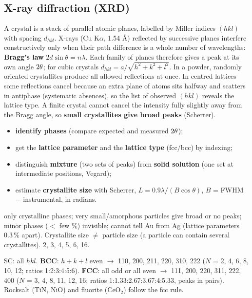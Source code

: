 \subsection{X-ray diffraction (XRD)}
{A crystal is a stack of parallel atomic planes, labelled by Miller indices $(hkl)$ with spacing $d_{hkl}$. X-rays (Cu K$\alpha$,
1.54 \AA) reflected by successive planes interfere constructively only when their path difference is a whole number of wavelengths:
\textbf{Bragg's law} $2d\sin\theta = n\lambda$. Each family of planes therefore gives a peak at its own angle $2\theta$; for cubic
crystals $d_{hkl} = a/\sqrt{h^2+k^2+l^2}$. In a powder, randomly oriented crystallites produce all allowed reflections at once.
In centred lattices some reflections cancel because an extra plane of atoms sits halfway and scatters in antiphase (systematic
absences), so the list of observed $(hkl)$ reveals the lattice type. A finite crystal cannot cancel the intensity fully slightly away
from the Bragg angle, so \textbf{small crystallites give broad peaks} (Scherrer).}
{\begin{itemize}
 \item \textbf{identify phases} (compare expected and measured $2\theta$);
 \item get the \textbf{lattice parameter} and the \textbf{lattice type} (fcc/bcc) by indexing;
 \item distinguish \textbf{mixture} (two sets of peaks) from \textbf{solid solution} (one set at intermediate positions, Vegard\extra);
 \item estimate \textbf{crystallite size} with Scherrer, $L = 0.9\lambda/(B\cos\theta)$, $B$ = FWHM $-$ instrumental, in radians.
\end{itemize}}
{only crystalline phases; very small/amorphous particles give broad or no peaks; minor phases ($<$ few \%) invisible; cannot tell
Au from Ag (lattice parameters 0.3\,\% apart). Crystallite size $\neq$ particle size (a particle can contain several
crystallites).}
{2, 3, 4, 5, 6, 16.}
\begin{keybox}
SC: all $hkl$. \textbf{BCC}: $h+k+l$ even $\to$ 110, 200, 211, 220, 310, 222 ($N$ = 2, 4, 6, 8, 10, 12; ratios 1:2:3:4:5:6).
\textbf{FCC}: all odd or all even $\to$ 111, 200, 220, 311, 222, 400 ($N$ = 3, 4, 8, 11, 12, 16; ratios 1:1.33:2.67:3.67:4:5.33,
peaks in pairs). Rocksalt (TiN, NiO) and fluorite (CeO$_2$) follow the fcc rule.
\end{keybox}

